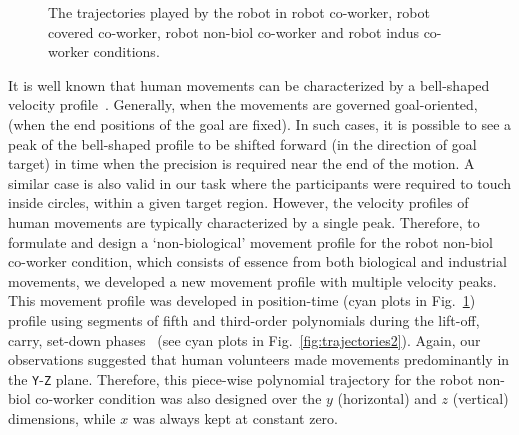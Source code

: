  
\begin{figure}[hpt]
	\caption{The trajectories played by the robot in robot co-worker, robot covered co-worker, robot non-biol co-worker and robot indus co-worker conditions.}
	\label{fig:trajectories}
\end{figure}


It is well known that human movements can be characterized by a bell-shaped velocity profile~\cite{flash1985coordination}. Generally, when the movements are governed goal-oriented, (when the end positions of the goal are fixed). In such cases, it is possible to see a peak of the bell-shaped profile to be shifted forward (in the direction of goal target) in time when the precision is required near the end of the motion. A similar case is also valid in our task where the participants were required to touch inside circles, within a given target region. However, the velocity profiles of human movements are typically characterized by a single peak. Therefore, to formulate and design a `non-biological' movement profile for the robot non-biol co-worker condition, which consists of essence from both biological and industrial movements, we developed a new movement profile with multiple velocity peaks. This movement profile was developed in position-time (cyan plots in Fig.~\ref{fig:trajectories}) profile using segments of fifth and third-order polynomials during the lift-off, carry, set-down phases~\cite{Biagiotti:Springer:2008} (see cyan plots in Fig.~\ref{fig:trajectories2}). Again, our observations suggested that human volunteers made movements predominantly in the \texttt{Y}-\texttt{Z} plane. Therefore, this piece-wise polynomial trajectory for the robot non-biol co-worker condition was also designed over the $y$ (horizontal) and $z$ (vertical) dimensions, while $x$ was always kept at constant zero.



